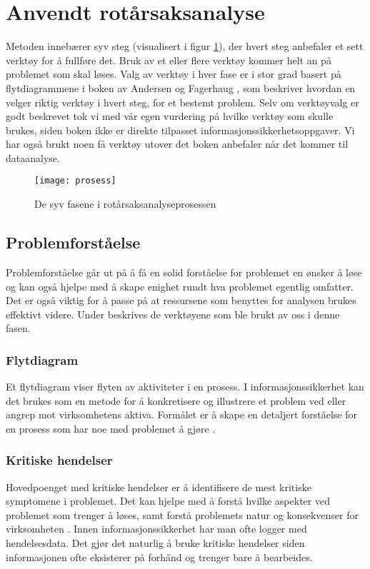 \section{Anvendt rotårsaksanalyse}
Metoden innebærer syv steg (visualisert i figur \ref{fig:prosess}), der hvert steg anbefaler et sett verktøy for å fullføre det. Bruk av et eller flere verktøy kommer helt an på problemet som skal løses. Valg av verktøy i hver fase er i stor grad basert på flytdiagrammene i boken av Andersen og Fagerhaug \cite{RCA}, som beskriver hvordan en velger riktig verktøy i hvert steg, for et bestemt problem. Selv om verktøyvalg er godt beskrevet tok vi med vår egen vurdering på hvilke verktøy som skulle brukes, siden boken ikke er direkte tilpasset informasjonssikkerhetsoppgaver. Vi har også brukt noen få verktøy utover det boken anbefaler når det kommer til dataanalyse. 

\begin{figure}[H]
    \centering
    \texttt{[image: prosess]}
    \caption[RCA-prosess]{De syv fasene i rotårsaksanalyseprosessen}
    \label{fig:prosess}
\end{figure}

\subsection{Problemforståelse}
Problemforståelse går ut på å få en solid forståelse for problemet en ønsker å løse og kan også hjelpe med å skape enighet rundt hva problemet egentlig omfatter. Det er også viktig for å passe på at ressursene som benyttes for analysen brukes effektivt videre. Under beskrives de verktøyene som ble brukt av oss i denne fasen. 

\subsubsection{Flytdiagram}
Et flytdiagram viser flyten av aktiviteter i en prosess. I informasjonssikkerhet kan det brukes som en metode for å konkretisere og illustrere et problem ved eller angrep mot virksomhetens aktiva. Formålet er å skape en detaljert forståelse for en prosess som har noe med problemet å gjøre \cite{RCA}.

\subsubsection{Kritiske hendelser}
Hovedpoenget med kritiske hendelser er å identifisere de mest kritiske symptomene i problemet. Det kan hjelpe med å forstå hvilke aspekter ved problemet som trenger å løses, samt forstå problemets natur og konsekvenser for virksomheten \cite{RCA}. Innen informasjonssikkerhet har man ofte logger med hendelsesdata. Det gjør det naturlig å bruke kritiske hendelser siden informasjonen ofte eksisterer på forhånd og trenger bare å bearbeides. 

